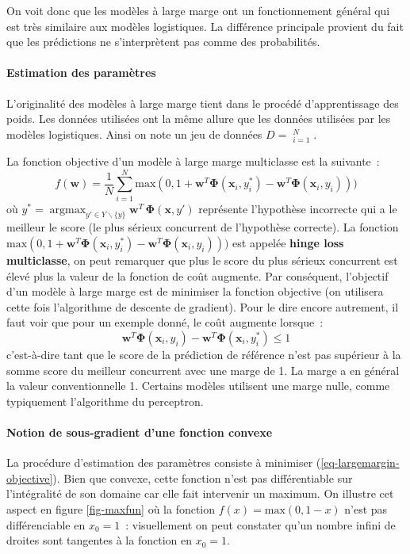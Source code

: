 \documentclass[11pt,openany]{book}
\newcommand{\kw}[1]{{\bf #1}} %
\begin{document}
On voit donc que les modèles à large marge ont un fonctionnement
général qui est très similaire aux modèles logistiques. La différence
principale provient du fait que les prédictions ne s'interprètent pas
comme des probabilités.



\paragraph{Estimation des paramètres} L'originalité des modèles à
large marge tient dans le procédé d'apprentissage des poids. Les
données utilisées ont la même allure que les données utilisées par les
modèles logistiques. Ainsi on note un jeu de données $D = \mathop{(\mathbf{x}_i,y_i)}_{i=1}^N$.

La fonction objective d'un modèle à large marge multiclasse est la suivante~:
\begin{equation}
\label{eq-largemargin-objective}
f(\mathbf{w}) = \frac{1}{N}\sum_{i=1}^N \text{max}(0,
1+\mathbf{w}^T\boldsymbol\Phi(\mathbf{x}_i,y^*_i) - \mathbf{w}^T\boldsymbol\Phi(\mathbf{x}_i,y_i) ))
\end{equation}
où $y^* = 
\mathop{\text{argmax}}_{y'\in Y\backslash\{y\}} \mathbf{w}^T \,
    \boldsymbol\Phi(\mathbf{x},y')$ représente l'hypothèse incorrecte
    qui a le meilleur le score (le plus sérieux concurrent de
    l'hypothèse correcte).  La fonction $\text{max}(0,
1+\mathbf{w}^T\boldsymbol\Phi(\mathbf{x}_i,y^*_i) - \mathbf{w}^T\boldsymbol\Phi(\mathbf{x}_i,y_i) ))$
est appelée \kw{hinge loss multiclasse}, on peut remarquer que plus
le score du plus sérieux concurrent est élevé plus la valeur de la
fonction de coût augmente.
Par conséquent, l'objectif d'un modèle à large marge est de minimiser la fonction
objective (on utilisera cette fois l'algorithme de descente de gradient).
Pour le dire encore autrement,  il faut voir que pour un exemple donné, le
coût augmente lorsque~:
\begin{displaymath}
\mathbf{w}^T\boldsymbol\Phi(\mathbf{x}_i,y_i)  -
\mathbf{w}^T\boldsymbol\Phi(\mathbf{x}_i,y^*_i) \leq 1
\end{displaymath}
c'est-à-dire tant que le score de la prédiction de référence n'est pas supérieur à
la somme score du meilleur concurrent avec une marge de 1. La marge a
en général la valeur conventionnelle 1.  Certains modèles utilisent
une marge nulle, comme typiquement  l'algorithme du perceptron.

\paragraph{Notion de sous-gradient d'une fonction convexe}La procédure d'estimation des paramètres consiste à minimiser
(\ref{eq-largemargin-objective}).  Bien que convexe, cette fonction n'est pas
différentiable sur l'intégralité de son domaine car elle fait intervenir
un maximum. On illustre cet aspect en figure \ref{fig-maxfun} où la
fonction $f(x) = \text{max}(0,1-x)$ n'est pas différenciable en
$x_0=1$~: visuellement on peut constater qu'un nombre infini de droites
sont tangentes à la fonction en $x_0=1$.
\end{document}
